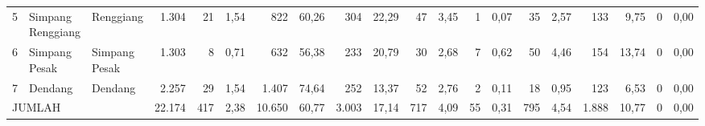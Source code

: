 \begin{small}
\begin{tabular}{rllrrrrrrrrrrrrrrrrr}
	5 & Simpang Renggiang & Renggiang     &  1.304 &  21 & 1,54 &    822 & 60,26 &   304 & 22,29 &  47 & 3,45 &  1 & 0,07 &  35 & 2,57 &   133 &  9,75 & 0 & 0,00 \\
	6 & Simpang Pesak     & Simpang Pesak &  1.303 &   8 & 0,71 &    632 & 56,38 &   233 & 20,79 &  30 & 2,68 &  7 & 0,62 &  50 & 4,46 &   154 & 13,74 & 0 & 0,00 \\
	7 & Dendang           & Dendang       &  2.257 &  29 & 1,54 &  1.407 & 74,64 &   252 & 13,37 &  52 & 2,76 &  2 & 0,11 &  18 & 0,95 &   123 &  6,53 & 0 & 0,00 \\
    \midrule
    \multicolumn{3}{l}{JUMLAH}            & 22.174 & 417 & 2,38 & 10.650 & 60,77 & 3.003 & 17,14 & 717 & 4,09 & 55 & 0,31 & 795 & 4,54 & 1.888 & 10,77 & 0 & 0,00 \\
    \bottomrule
\end{tabular}%
\end{small} 



